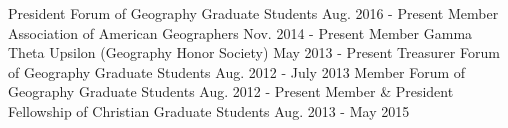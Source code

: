 \begin{cvmemberships}
  \cvmembership
    {\hspace{-3 em} President}
    {Forum of Geography Graduate Students}
    {\hspace{-2 em} Aug. 2016 - Present}
    {} %
  \cvmembership
    {\hspace{-3 em} Member}
    {Association of American Geographers}
    {Nov. 2014 - Present}
    {} %
  \cvmembership
    {\hspace{-3 em} Member}
    {Gamma Theta Upsilon (Geography Honor Society)}
    {May 2013 - Present}
    {} %
  \cvmembership
    {\hspace{-3 em} Treasurer}
    {Forum of Geography Graduate Students}
    {\hspace{-2 em} Aug. 2012 - July 2013}
    {} %
  \cvmembership
    {\hspace{-3 em} Member}
    {Forum of Geography Graduate Students}
    {Aug. 2012 - Present}
    {} %
  \cvmembership
    {\hspace{-3 em} Member \& President}
    {Fellowship of Christian Graduate Students}
    {\hspace{-2 em} Aug. 2013 - May 2015}
    {} %
\end{cvmemberships}
